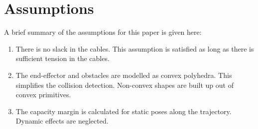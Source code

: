 \section{Assumptions}

	A brief summary of the assumptions for this paper is given here:

	\begin{enumerate}

		\item \label{assumption:cable_slack}

			There is no slack in the cables. This assumption is satisfied as
			long as there is sufficient tension in the cables.


		\item \label{assumption:convex_polyhedra}

			The end-effector and obstacles are modelled as convex polyhedra.
			This simplifies the collision detection. Non-convex shapes are built
			up out of convex primitives.


		\item \label{assumption:static_capacity_margin}

			The capacity margin is calculated for static poses along the
			trajectory. Dynamic effects are neglected.


	\end{enumerate}
